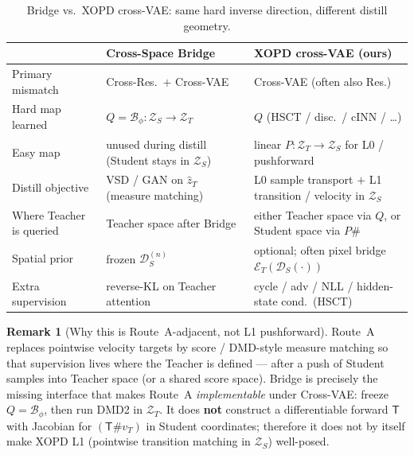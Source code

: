 \documentclass[11pt,a4paper]{article}
\newcommand{\Za}{\mathcal{Z}_{T}}
\newcommand{\Zb}{\mathcal{Z}_{S}}
\newcommand{\Enc}{\mathcal{E}}
\newcommand{\Dec}{\mathcal{D}}
\newcommand{\Bridge}{\mathcal{B}}
\newcommand{\Tmap}{\mathsf{T}}
\newcommand{\push}{\#}
\theoremstyle{definition}
\newtheorem{remark}{Remark}
\begin{document}
\begin{table}[ht]
\centering
\small
\begin{tabular}{@{}p{3.2cm}p{4.6cm}p{4.6cm}@{}}
\toprule
& \textbf{Cross-Space Bridge} & \textbf{XOPD cross-VAE (ours)} \\
\midrule
Primary mismatch & Cross-Res.\ $+$ Cross-VAE & Cross-VAE (often also Res.) \\
Hard map learned & $Q=\Bridge_\phi:\Zb\to\Za$ & $Q$ (HSCT / disc.\ / cINN / \ldots) \\
Easy map & unused during distill (Student stays in $\Zb$) &
  linear $P:\Za\to\Zb$ for L0 / pushforward \\
Distill objective & VSD / GAN on $\hat z_T$ (measure matching) &
  L0 sample transport $+$ L1 transition / velocity in $\Zb$ \\
Where Teacher is queried & Teacher space after Bridge &
  either Teacher space via $Q$, or Student space via $P\push$ \\
Spatial prior & frozen $\Dec_S^{(n)}$ &
  optional; often pixel bridge $\Enc_T(\Dec_S(\cdot))$ \\
Extra supervision & reverse-KL on Teacher attention &
  cycle / adv / NLL / hidden-state cond.\ (HSCT) \\
\bottomrule
\end{tabular}
\caption{Bridge vs.\ XOPD cross-VAE: same hard inverse direction, different distill
geometry.}
\label{tab:compare}
\end{table}

\begin{remark}[Why this is Route~A-adjacent, not L1 pushforward]
\label{rem:route-a}
 Route~A replaces pointwise velocity
targets by score / DMD-style measure matching so that supervision lives where the
Teacher is defined --- after a push of Student samples into Teacher space (or a shared
score space). Bridge is precisely the missing interface that makes Route~A
\emph{implementable} under Cross-VAE: freeze $Q=\Bridge_\phi$, then run DMD2 in
$\Za$. It does \textbf{not} construct a differentiable forward $\Tmap$ with Jacobian
for $(\Tmap\push v_T)$ in Student coordinates; therefore it does not by itself make
XOPD L1 (pointwise transition matching in $\Zb$) well-posed.
\end{remark}
\end{document}
